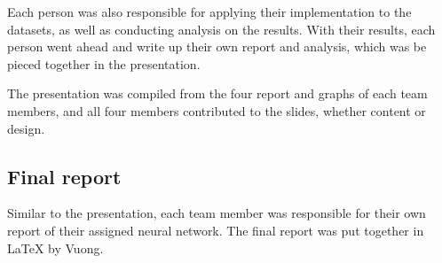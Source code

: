 \documentclass[letterpaper, 10 pt, conference]{ieeeconf}  %
\begin{document}
        Each person was also responsible for applying their implementation to the datasets, as well as conducting analysis on the results. With their results, each person went ahead and write up their own report and analysis, which was be pieced together in the presentation.

        The presentation was compiled from the four report and graphs of each team members, and all four members contributed to the slides, whether content or design.

    \subsection{Final report}
        Similar to the presentation, each team member was responsible for their own report of their assigned neural network. The final report was put together in LaTeX by Vuong.


\cite{PURUSHOTHAM2018112}



\end{document}
